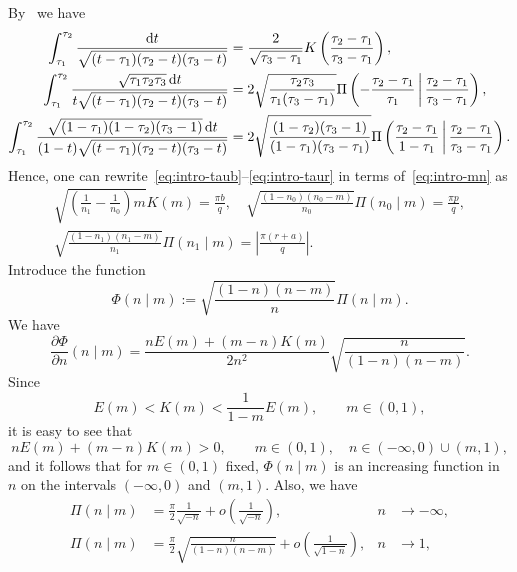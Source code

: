 \documentclass{amsart}
\renewcommand{\d}{\mathrm{d}}
\newcommand{\bigmid}{\,\middle\vert\,}
\theoremstyle{plain}
\theoremstyle{definition}
\theoremstyle{remark}
\begin{document}
By~\cite[233.00 and 233.02]{BF1971} we have
\begin{align}
\int_{\tau_1}^{\tau_2}\frac{\d t}{\sqrt{(t-\tau_1)(\tau_2-t)(\tau_3-t)}}&=
\frac{2}{\sqrt{\tau_3-\tau_1}}
K\left(\frac{\tau_2-\tau_1}{\tau_3-\tau_1}\right),\notag\\
\int_{\tau_1}^{\tau_2}
\frac{\sqrt{\tau_1\tau_2\tau_3}\,\d t}{t\sqrt{(t-\tau_1)(\tau_2-t)(\tau_3-t)}}&=
2\sqrt{\frac{\tau_2\tau_3}{\tau_1(\tau_3-\tau_1)}}
\Pi\left(-\frac{\tau_2-\tau_1}{\tau_1}\bigmid
\frac{\tau_2-\tau_1}{\tau_3-\tau_1}\right),\label{eq:taus-bf}\\
\int_{\tau_1}^{\tau_2}
\frac{\sqrt{(1-\tau_1)(1-\tau_2)(\tau_3-1)}\,\d t}
{(1-t)\sqrt{(t-\tau_1)(\tau_2-t)(\tau_3-t)}}&=
2\sqrt{\frac{(1-\tau_2)(\tau_3-1)}{(1-\tau_1)(\tau_3-\tau_1)}}
\Pi\left(\frac{\tau_2-\tau_1}{1-\tau_1}\bigmid
\frac{\tau_2-\tau_1}{\tau_3-\tau_1}\right).\notag
\end{align}
Hence, one can rewrite~\eqref{eq:intro-taub}--\eqref{eq:intro-taur} in terms
of~\eqref{eq:intro-mn} as
\begin{equation}\label{eq:taus-nm}
\begin{gathered}
\sqrt{\left(\frac{1}{n_1}-\frac{1}{n_0}\right)m}K(m)=\frac{\pi b}q,\quad
\sqrt{\frac{(1-n_0)(n_0-m)}{n_0}}\Pi(n_0\mid m)=\frac{\pi p}q,\\
\sqrt{\frac{(1-n_1)(n_1-m)}{n_1}}\Pi(n_1\mid m)=\left|\frac{\pi (r+a)}q\right|.
\end{gathered}
\end{equation}
Introduce the function
\begin{equation}\label{eq:taus-Phi}
\Phi(n\mid m):=
\sqrt{\frac{(1-n)(n-m)}n}\Pi(n\mid m).
\end{equation}
We have
\[
\frac{\partial\Phi}{\partial n}(n\mid m)=
\frac{nE(m)+(m-n)K(m)}{2n^2}\sqrt{\frac{n}{(1-n)(n-m)}}.
\]
Since
\begin{equation}\label{eq:taus-EKineq}
E(m)<K(m)<\frac{1}{1-m}E(m),\qquad m\in (0,1),
\end{equation}
it is easy to see that
\begin{equation}\label{eq:taus-EKpos}
nE(m)+(m-n)K(m)>0,\qquad m\in (0,1),\quad n\in (-\infty,0)\cup (m,1),
\end{equation}
and it follows that for \(m\in (0,1)\) fixed, \(\Phi(n\mid m)\) is an increasing
function in \(n\) on the intervals \((-\infty,0)\) and \((m,1)\). Also, we have
\begin{equation}\label{eq:taus-nlim}
\begin{aligned}
\Pi(n\mid m)&=\frac{\pi}2\frac{1}{\sqrt{-n}}+o\left(\frac{1}{\sqrt{-n}}\right),&
n&\to -\infty,\\
\Pi(n\mid m)&=\frac{\pi}2\sqrt{\frac{n}{(1-n)(n-m)}}+
o\left(\frac{1}{\sqrt{1-n}}\right),&
n&\to 1,
\end{aligned}
\end{equation}
\end{document}
